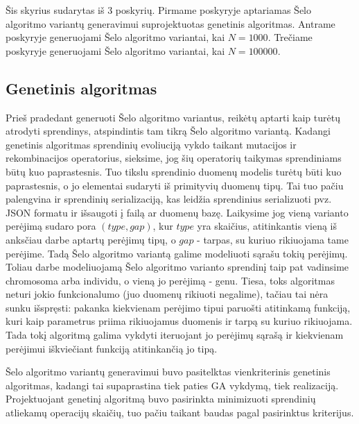 \documentclass{VUMIFInfKursinis}
\begin{document}
Šis skyrius sudarytas iš 3 poskyrių.
Pirmame poskyryje aptariamas Šelo algoritmo variantų generavimui suprojektuotas genetinis algoritmas.
Antrame poskyryje generuojami Šelo algoritmo variantai, kai $N = 1000$.
Trečiame poskyryje generuojami Šelo algoritmo variantai, kai $N = 100000$.

\subsection{Genetinis algoritmas}

Prieš pradedant generuoti Šelo algoritmo variantus, reikėtų aptarti kaip turėtų atrodyti sprendinys, atspindintis tam tikrą Šelo algoritmo variantą.
Kadangi genetinis algoritmas sprendinių evoliuciją vykdo taikant mutacijos ir rekombinacijos operatorius, sieksime, jog šių operatorių taikymas sprendiniams būtų kuo paprastesnis.
Tuo tikslu sprendinio duomenų modelis turėtų būti kuo paprastesnis, o jo elementai sudaryti iš primityvių duomenų tipų.
Tai tuo pačiu palengvina ir sprendinių serializaciją, kas leidžia sprendinius serializuoti pvz.
JSON formatu ir išsaugoti į failą ar duomenų bazę.
Laikysime jog vieną varianto perėjimą sudaro pora $(type, gap)$, kur $type$ yra skaičius, atitinkantis vieną iš anksčiau darbe aptartų perėjimų tipų,
o $gap$ - tarpas, su kuriuo rikiuojama tame perėjime.
Tadą Šelo algoritmo variantą galime modeliuoti sąrašu tokių perėjimų.
Toliau darbe modeliuojamą Šelo algoritmo varianto sprendinį taip pat vadinsime chromosoma arba individu, o vieną jo perėjimą - genu. 
Tiesa, toks algoritmas neturi jokio funkcionalumo (juo duomenų rikiuoti negalime), tačiau tai nėra sunku išspręsti: pakanka kiekvienam perėjimo tipui
paruošti atitinkamą funkciją, kuri kaip parametrus priima rikiuojamus duomenis ir tarpą su kuriuo rikiuojama.
Tada tokį algoritmą galima vykdyti iteruojant jo perėjimų sąrašą ir kiekvienam perėjimui iškviečiant funkciją atitinkančią jo tipą.

Šelo algoritmo variantų generavimui buvo pasitelktas vienkriterinis genetinis algoritmas,
kadangi tai supaprastina tiek paties GA vykdymą, tiek realizaciją.
Projektuojant genetinį algoritmą buvo pasirinkta minimizuoti sprendinių atliekamų operacijų skaičių,
tuo pačiu taikant baudas pagal pasirinktus kriterijus.
\end{document}
